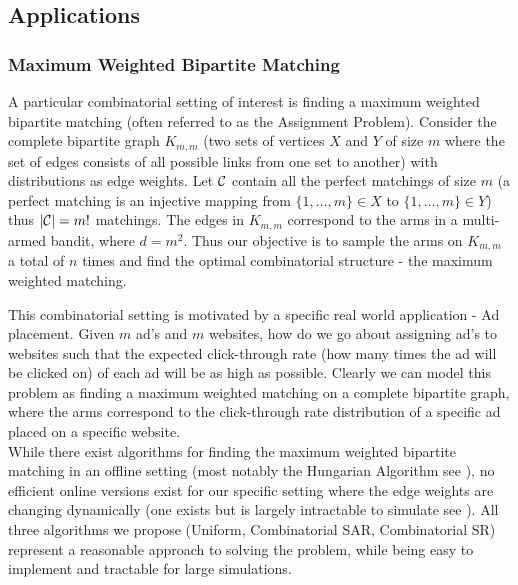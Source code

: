 \documentclass[11.75pt,oneside]{amsart}
\begin{document}
\subsection{Applications} \label{sec:appli}

\subsubsection{Maximum Weighted Bipartite Matching} \label{sec:maxbipalgo}
A particular combinatorial setting of interest is finding a maximum weighted bipartite matching (often referred to as the Assignment Problem). Consider the complete bipartite graph $K_{m,m}$ (two sets of vertices $X$ and $Y$ of size $m$ where the set of edges consists of all possible links from one set to another) with distributions as edge weights. Let $\mathcal{C}$ contain all the perfect matchings of size $m$ (a perfect matching is an injective mapping from $\{1,\hdots,m\} \in X$ to $\{1,\hdots,m\} \in Y$) thus $|\mathcal{C}|=m!$ matchings. The edges in $K_{m,m}$ correspond to the arms in a multi-armed bandit, where $d=m^2$. Thus our objective is to sample the arms on $K_{m,m}$ a total of $n$ times and find the optimal combinatorial structure - the maximum weighted matching.\\

\cite{BWV13}

This combinatorial setting is motivated by a specific real world application - Ad placement. Given $m$ ad's and $m$ websites, how do we go about assigning ad's to websites such that the expected click-through rate (how many times the ad will be clicked on) of each ad will be as high as possible. Clearly we can model this problem as finding a maximum weighted matching on a complete bipartite graph, where the arms correspond to the click-through rate distribution of a specific ad placed on a specific website.\\

While there exist algorithms for finding the maximum weighted bipartite matching in an offline setting (most notably the Hungarian Algorithm see \cite{DW01}), no efficient online versions exist for our specific setting where the edge weights are changing dynamically (one exists but is largely intractable to simulate see \cite{ASB07}). All three algorithms we propose (Uniform, Combinatorial SAR, Combinatorial SR) represent a reasonable approach to solving the problem, while being easy to implement and tractable for large simulations.\\
\end{document}
